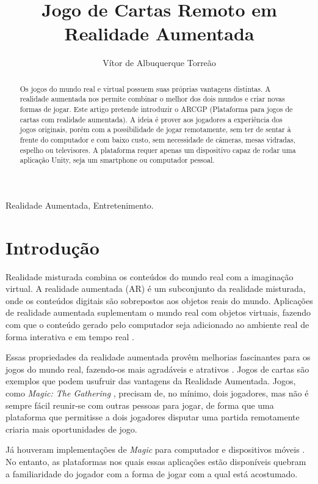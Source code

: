 \documentclass[conference]{IEEEtran}
\title{Jogo de Cartas Remoto em Realidade Aumentada}
\author{Vítor de Albuquerque Torreão}
\begin{document}
\maketitle

\begin{abstract}
	Os jogos do mundo real e virtual possuem suas próprias vantagens distintas. 
	A realidade aumentada nos permite combinar o melhor dos dois mundos e criar 
	novas formas de jogar. Este artigo pretende introduzir o ARCGP (Plataforma 
	para jogos de cartas com realidade aumentada). A ideia é prover aos 
	jogadores a experiência dos jogos originais, porém com a possibilidade de 
	jogar remotamente, sem ter de sentar à frente do computador e com baixo 
	custo, sem necessidade de câmeras, mesas vidradas, espelho ou televisores. 
	A plataforma requer apenas um dispositivo capaz de rodar uma aplicação 
	Unity, seja um smartphone ou computador pessoal.
\end{abstract}

\begin{IEEEkeywords}
	Realidade Aumentada, Entretenimento.
\end{IEEEkeywords}

\section{Introdução}
Realidade misturada combina os conteúdos do mundo real com a imaginação virtual.
A realidade aumentada (AR) é um subconjunto da realidade misturada, onde os 
conteúdos digitais são sobrepostos aos objetos reais do mundo. Aplicações de 
realidade aumentada suplementam o mundo real com objetos virtuais, fazendo com 
que o conteúdo gerado pelo computador seja adicionado ao ambiente real de forma 
interativa e em tempo real \cite{burdea2003virtual}.

Essas propriedades da realidade aumentada provêm melhorias fascinantes para os 
jogos do mundo real, fazendo-os mais agradáveis e atrativos 
\cite{Lam:2006:AAR:1128923.1128987}. Jogos de cartas são exemplos que podem 
usufruir das vantagens da Realidade Aumentada. Jogos, como \textit{Magic: The 
Gathering} \cite{magic}, precisam de, no mínimo, dois jogadores, mas não é 
sempre fácil reunir-se com outras pessoas para jogar, de forma que uma 
plataforma que permitisse a dois jogadores disputar uma partida remotamente 
criaria mais oportunidades de jogo.

Já houveram implementações de \textit{Magic} para computador e dispositivos 
móveis \cite{magic_duels}. No entanto, as plataformas nos quais essas 
aplicações estão disponíveis quebram  a familiaridade do jogador com a forma 
de jogar com a qual está acostumado.
\end{document}
